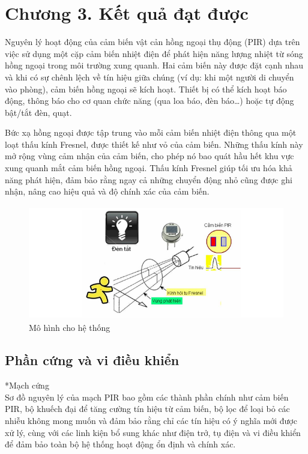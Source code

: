 \documentclass{article}
\begin{document}
\section*{Chương 3. Kết quả đạt được}
\setcounter{section}{3}
\setcounter{subsection}{0}
Nguyên lý hoạt động của cảm biến vật cản hồng ngoại thụ động (PIR) dựa trên việc sử dụng một cặp cảm biến nhiệt điện để phát hiện năng lượng nhiệt từ sóng hồng ngoại trong môi trường xung quanh. Hai cảm biến này được đặt cạnh nhau và khi có sự chênh lệch về tín hiệu giữa chúng (ví dụ: khi một người di chuyển vào phòng), cảm biến hồng ngoại sẽ kích hoạt. Thiết bị có thể kích hoạt báo động, thông báo cho cơ quan chức năng (qua loa báo, đèn báo…) hoặc tự động bật/tắt đèn, quạt.

Bức xạ hồng ngoại được tập trung vào mỗi cảm biến nhiệt điện thông qua một loạt thấu kính Fresnel, được thiết kế như vỏ của cảm biến. Những thấu kính này mở rộng vùng cảm nhận của cảm biến, cho phép nó bao quát hầu hết khu vực xung quanh mắt cảm biến hồng ngoại. Thấu kính Fresnel giúp tối ưu hóa khả năng phát hiện, đảm bảo rằng ngay cả những chuyển động nhỏ cũng được ghi nhận, nâng cao hiệu quả và độ chính xác của cảm biến.
\begin{figure}[H]
    \centering
    \includegraphics[width=12cm,height=5cm]{image/anh5.png}
    \caption{Mô hình cho hệ thống} \label{EV}
\end{figure}
\subsection{Phần cứng và vi điều khiển}
*Mạch cứng\\
Sơ đồ nguyên lý của mạch PIR bao gồm các thành phần chính như cảm biến PIR, bộ khuếch đại để tăng cường tín hiệu từ cảm biến, bộ lọc để loại bỏ các nhiễu không mong muốn và đảm bảo rằng chỉ các tín hiệu có ý nghĩa mới được xử lý, cùng với các linh kiện bổ sung khác như điện trở, tụ điện và vi điều khiển để đảm bảo toàn bộ hệ thống hoạt động ổn định và chính xác.
 
\end{document}
